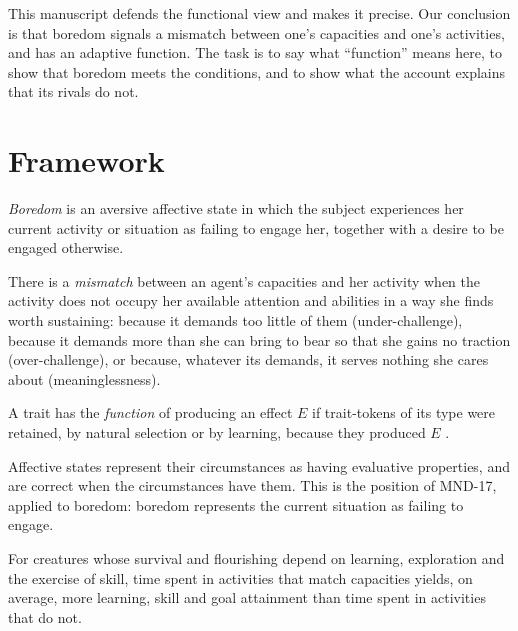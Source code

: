 \documentclass{situationist-preprint}
\begin{document}
This manuscript defends the functional view and makes it precise. Our conclusion is that boredom signals a mismatch between one's capacities and one's activities, and has an adaptive function. The task is to say what \enquote{function} means here, to show that boredom meets the conditions, and to show what the account explains that its rivals do not.

\section{Framework}

\begin{definition}[Boredom]\label{d:bored}
\emph{Boredom} is an aversive affective state in which the subject experiences her current activity or situation as failing to engage her, together with a desire to be engaged otherwise.
\end{definition}

\begin{definition}[Mismatch]\label{d:mismatch}
There is a \emph{mismatch} between an agent's capacities and her activity when the activity does not occupy her available attention and abilities in a way she finds worth sustaining: because it demands too little of them (under-challenge), because it demands more than she can bring to bear so that she gains no traction (over-challenge), or because, whatever its demands, it serves nothing she cares about (meaninglessness).
\end{definition}

\begin{definition}[Function]\label{d:function}
A trait has the \emph{function} of producing an effect $E$ if trait-tokens of its type were retained, by natural selection or by learning, because they produced $E$ \citep{Millikan1984}.
\end{definition}

\begin{principle}\label{p:content}
Affective states represent their circumstances as having evaluative properties, and are correct when the circumstances have them. This is the position of MND-17, applied to boredom: boredom represents the current situation as failing to engage.
\end{principle}

\begin{assumption}\label{a:value}
For creatures whose survival and flourishing depend on learning, exploration and the exercise of skill, time spent in activities that match capacities yields, on average, more learning, skill and goal attainment than time spent in activities that do not.
\end{assumption}
\end{document}
